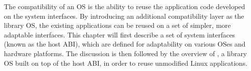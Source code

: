 The compatibility of an OS is the ability to reuse the application code developed on the system interfaces.
By introducing an additional compatibility layer as the library OS,
the existing applications can be reused on a set of simpler, more adaptable interfaces.
This chapter will first describe a set of system interfaces (known as the host ABI), which are defined for adaptability on various OSes and hardware platforms. The discussion is then followed by the overview of \graphene{}, a library OS built on top of the host ABI, in order to reuse unmodified Linux applications.